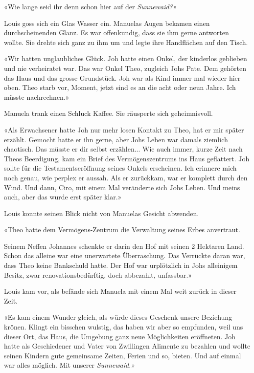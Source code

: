«Wie lange seid ihr denn schon hier auf der \emph{Sunnewaid?»}

Louis goss sich ein Glas Wasser ein. Manuelas Augen bekamen einen
durchscheinenden Glanz. Es war offenkundig, dass sie ihm gerne antworten
wollte. Sie drehte sich ganz zu ihm um und legte ihre Handflächen auf
den Tisch.

«Wir hatten unglaubliches Glück. Joh hatte einen Onkel, der kinderlos
geblieben und nie verheiratet war. Das war Onkel Theo, zugleich Johs
Pate. Dem gehörten das Haus und das grosse Grundstück. Joh war als Kind
immer mal wieder hier oben. Theo starb vor, Moment, jetzt sind es an die
acht oder neun Jahre. Ich müsste nachrechnen.»

Manuela trank einen Schluck Kaffee. Sie räusperte sich geheimnisvoll.

«Als Erwachsener hatte Joh nur mehr losen Kontakt zu Theo, hat er mir
später erzählt. Gemocht hatte er ihn gerne, aber Johs Leben war damals
ziemlich chaotisch. Das müsste er dir selbst erzählen... Wie auch immer,
kurze Zeit nach Theos Beerdigung, kam ein Brief des Vermögenszentrums
ins Haus geflattert. Joh sollte für die Testamentseröffnung seines
Onkels erscheinen. Ich erinnere mich noch genau, wie perplex er aussah.
Als er zurückkam, war er komplett durch den Wind. Und dann, Ciro, mit
einem Mal veränderte sich Johs Leben. Und meins auch, aber das wurde
erst später klar.»

Louis konnte seinen Blick nicht von Manuelas Gesicht abwenden.

«Theo hatte dem Vermögens-Zentrum die Verwaltung seines Erbes
anvertraut.

Seinem Neffen Johannes schenkte er darin den Hof mit seinen 2 Hektaren
Land. Schon das alleine war eine unerwartete Überraschung. Das Verrückte
daran war, dass Theo keine Bankschuld hatte. Der Hof war urplötzlich in
Johs alleinigem Besitz, zwar renovationsbedürftig, doch abbezahlt,
unfassbar.»

Louis kam vor, als befände sich Manuela mit einem Mal weit zurück in
dieser Zeit.

«Es kam einem Wunder gleich, als würde dieses Geschenk unsere Beziehung
krönen. Klingt ein bisschen wulstig, das haben wir aber so empfunden,
weil uns dieser Ort, das Haus, die Umgebung ganz neue Möglichkeiten
eröffneten. Joh hatte als Geschiedener und Vater von Zwillingen Alimente
zu bezahlen und wollte seinen Kindern gute gemeinsame Zeiten, Ferien und
so, bieten. Und auf einmal war alles möglich. Mit unserer
\emph{Sunnewaid.»}

